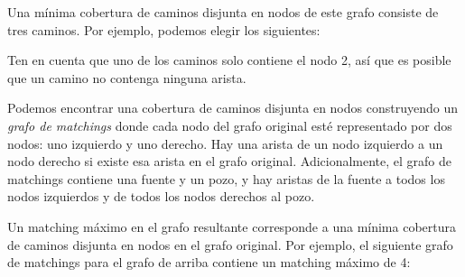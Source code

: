 Una mínima cobertura de caminos disjunta en nodos de este grafo
consiste de tres caminos. Por ejemplo, podemos elegir los siguientes:

\begin{center}
\end{center}

Ten en cuenta que uno de los caminos solo contiene el nodo 2,
así que es posible que un camino no contenga ninguna arista.

Podemos encontrar una cobertura de caminos disjunta en nodos
construyendo un \emph{grafo de matchings} donde cada nodo del grafo
original esté representado por dos nodos: uno izquierdo y uno derecho.
Hay una arista de un nodo izquierdo a un nodo derecho si existe esa arista
en el grafo original. Adicionalmente, el grafo de matchings contiene
una fuente y un pozo, y hay aristas de la fuente a todos los nodos
izquierdos y de todos los nodos derechos al pozo.

Un matching máximo en el grafo resultante corresponde a una mínima
cobertura de caminos disjunta en nodos en el grafo original. Por ejemplo,
el siguiente grafo de matchings para el grafo de arriba contiene un
matching máximo de 4:

